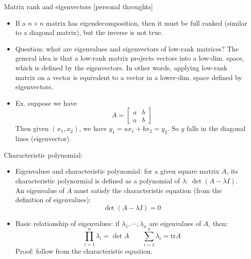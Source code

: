 \documentclass{report}
\begin{document}
Matrix rank and eigenvectors [personal throughts]
\begin{itemize}
	\item If a $n \times n$ matrix has eigendecomposition, then it must be full ranked (similar to a diagonal matrix), but the inverse is not true. 
	
	\item Question: what are eigenvalues and eigenvectors of low-rank matrices? The general idea is that a low-rank matrix projects vectors into a low-dim. space, which is defined by the eigenvectors. In other words, applying low-rank matrix on a vector is equivalent to a vector in a lower-dim. space defined by eigenvectors.  
	
	\item Ex. suppose we have 
	\begin{equation}
	A = \left[
	\begin{array}{ll}
	a & b\\
	a & b
	\end{array}
	\right]
	\end{equation}
	Then given $(x_1, x_2)$, we have $y_1 = a x_1 + b x_2 = y_2$. So $y$ falls in the diagonal lines (eigenvector). 
\end{itemize}

Characteristic polynomial: 
\begin{itemize}
	\item Eigenvalues and characteristic polynomial: for a given square matrix $A$, its characteristic polynormial is defined as a polynomial of $\lambda$: $\det (A - \lambda I)$. An eigenvalue of $A$ must satisfy the characteristic equation (from the definition of eigenvalues): 	
	\begin{equation}
	\det (A - \lambda I) = 0	
	\end{equation}
	\item Basic relationship of eigenvalues: if $\lambda_1, \cdots, \lambda_n$ are eigenvalues of $A$, then: 
	\begin{equation}
	\prod_{i=1}^n \lambda_i = \det A	\qquad \sum_{i=1}^n \lambda_i = \text{tr} A
	\end{equation}
	Proof: follow from the characteristic equation. 	
\end{itemize}
\end{document}
